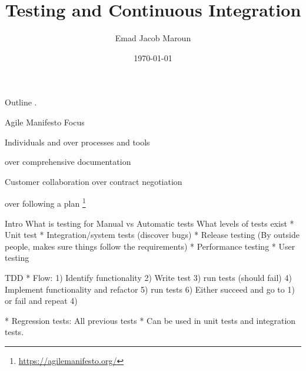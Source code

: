 

\newif\ifbook


\title{Testing and Continuous Integration}
\author{Emad Jacob Maroun}
\date{\today}



\begin{frame}
\titlepage
\end{frame}

\begin{frame}[fragile]{Outline}
	 .
\end{frame}

\begin{frame}[fragile]{Agile Manifesto Focus}

\begin{centering}
	
	Individuals and   over processes and tools
	\vspace{1em}
	
	 over comprehensive documentation
	\vspace{1em}
	
	Customer collaboration over contract negotiation
	\vspace{1em}
	
	 over following a plan \footnote{\href{https://agilemanifesto.org/}{https://agilemanifesto.org/}}

\end{centering}

\end{frame}

\begin{frame}[fragile]{Intro}
	What is testing for
	Manual vs Automatic tests
	What levels of tests exist
		* Unit test
		* Integration/system tests (discover bugs)
		* Release testing (By outside people, makes sure things follow the requirements)
		* Performance testing
		* User testing
\end{frame}


\begin{frame}[fragile]{TDD}
	* Flow: 1) Identify functionality
			2) Write test
			3) run tests (should fail)
			4) Implement functionality and refactor
			5) run tests
			6) Either succeed and go to 1) or fail and repeat 4)
	
	* Regression tests: All previous tests
	* Can be used in unit tests and integration tests.
\end{frame}


